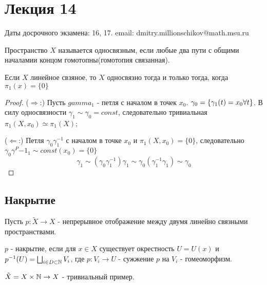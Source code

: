 \section{Лекция 14}

\begin{nota_bene}
    Даты досрочного экзамена: 16, 17.
    email: dmitry.millionschikov@math.msu.ru 
\end{nota_bene}

\begin{definition}
    Пространство $X$ называется односвязным, если любые два пути с общими началамии концом гомотопны(гомотопия связанная). 
\end{definition}

\begin{theorem}
    Если $X$ линейное свзяное, то $X$ односвязно тогда и только тогда, когда $\pi_1(x) = \{0\}$
\end{theorem}
\begin{proof}
    ($\Rightarrow$:)
        Пусть $gamma_1$ - петля с началом в точек $x_0$.
        $\gamma_0 = \left\{\gamma_1(t) = x_0 \forall t\right\}$. В силу односвязности $\gamma_1 \sim \gamma_0 = const$, следовательно тривиальная $\pi_1(X, x_0) \simeq \pi_1(X)$;


    ($\Leftarrow$:)
        Петля $\gamma_0 \gamma^{-1}_1$ с началом в точке $x_0$ и $\pi_1(X, x_0) = \{0\}$, следовательно $\gamma_0 \gamma^P{-1}_1 \sim const(x_0) = \{0\}$
        \[
            \gamma_1 \sim (\gamma_0 \gamma^{-1}_1) \gamma_1 \sim \gamma_0 (\gamma^{-1}_1 \gamma_1) \sim \gamma_0
        \] 
\end{proof}

\subsection{Накрытие}

Пусть $p: \tilde{X} \rightarrow X$ - непрерывное отображение между двумя линейно связными пространствами.

\begin{definition}
    $p$ - накрытие, если для $x \in X$ существует окрестность $U = U(x)$ и $p^{-1}(U) = \bigsqcup_{i \in D \subset \mathbb{N}} V_i$, где $p : V_i \rightarrow U$ - сужжение $p$ на $V_i$ - гомеоморфизм.
\end{definition}

\begin{example}
    $\tilde{X} = X \times \mathbb{N} \rightarrow X$ - тривиальный пример.
\end{example}
    
